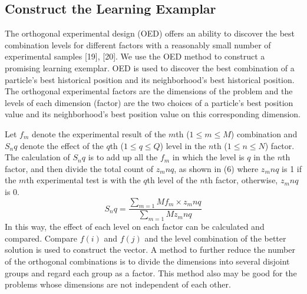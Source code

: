\subsection{Construct the Learning Examplar}\label{subsec:construct}
\par The orthogonal experimental design (OED) offers an ability to discover the best combination levels for different factors with a reasonably small number of experimental samples [19], [20]. We  use the OED method to construct a promising learning exemplar. OED is used to discover the best combination of a
particle’s best historical position and its neighborhood’s best historical position. The orthogonal experimental factors are the dimensions of the problem and the levels of each dimension (factor) are the two choices of a particle’s best position value and its neighborhood’s best position value on this corresponding dimension.
\par Let $f_m$ denote the experimental result of the $m$th ($1\leq m \leq M$) combination and $S_nq $ denote the effect of the $q$th ($1 \leq q \leq Q$) level in the $n$th ($1 \leq n \leq N$) factor. The calculation of $S_nq$ is to add up all the $f_m$ in which the level is $q$ in the $n$th factor, and then divide the total count of $z_mnq $, as shown in (6) where $z_mnq $ is 1 if the $m$th experimental test is with the $q$th level of the $n$th factor, otherwise, $z_mnq $ is 0.
\begin{equation}
 S_nq = \frac{\sum_{m=1}\nolimits M f_m \times z_mnq}{\sum_{m=1}\nolimits M z_mnq}
\end{equation}
In this way, the effect of each level on each factor can be calculated and compared. Compare $f(i)$ and $f (j)$ and the level combination of the better solution is used to construct the vector. A method to further
reduce the number of the orthogonal combinations is to divide the dimensions into several disjoint groups and regard each group as a factor. This method also may be good for the problems whose dimensions are not independent of each other.




